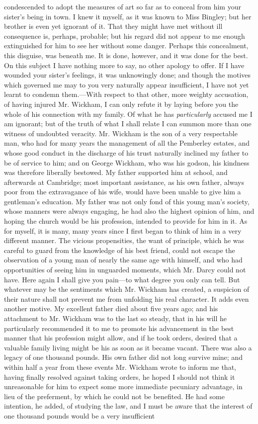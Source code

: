 \documentclass[12pt,openright]{book}
\begin{document}
condescended to adopt the measures of art so far as to conceal from him your sister’s being in town. I knew it myself, as it was known to Miss Bingley; but her brother is even yet ignorant of it. That they might have met without ill consequence is, perhaps, probable; but his regard did not appear to me enough extinguished for him to see her without some danger. Perhaps this concealment, this disguise, was beneath me. It is done, however, and it was done for the best. On this subject I have nothing more to say, no other apology to offer. If I have wounded your sister’s feelings, it was unknowingly done; and though the motives which governed me may to you very naturally appear insufficient, I have not yet learnt to condemn them.—With respect to that other, more weighty accusation, of having injured Mr. Wickham, I can only refute it by laying before you the whole of his connection with my family. Of what he has \textit{particularly} accused me I am ignorant; but of the truth of what I shall relate I can summon more than one witness of undoubted veracity. Mr. Wickham is the son of a very respectable man, who had for many years the management of all the Pemberley estates, and whose good conduct in the discharge of his trust naturally inclined my father to be of service to him; and on George Wickham, who was his godson, his kindness was therefore liberally bestowed. My father supported him at school, and afterwards at Cambridge; most important assistance, as his own father, always poor from the extravagance of his wife, would have been unable to give him a gentleman’s education. My father was not only fond of this young man’s society, whose manners were always engaging, he had also the highest opinion of him, and hoping the church would be his profession, intended to provide for him in it. As for myself, it is many, many years since I first began to think of him in a very different manner. The vicious propensities, the want of principle, which he was careful to guard from the knowledge of his best friend, could not escape the observation of a young man of nearly the same age with himself, and who had opportunities of seeing him in unguarded moments, which Mr. Darcy could not have. Here again I shall give you pain—to what degree you only can tell. But whatever may be the sentiments which Mr. Wickham has created, a suspicion of their nature shall not prevent me from unfolding his real character. It adds even another motive. My excellent father died about five years ago; and his attachment to Mr. Wickham was to the last so steady, that in his will he particularly recommended it to me to promote his advancement in the best manner that his profession might allow, and if he took orders, desired that a valuable family living might be his as soon as it became vacant. There was also a legacy of one thousand pounds. His own father did not long survive mine; and within half a year from these events Mr. Wickham wrote to inform me that, having finally resolved against taking orders, he hoped I should not think it unreasonable for him to expect some more immediate pecuniary advantage, in lieu of the preferment, by which he could not be benefited. He had some intention, he added, of studying the law, and I must be aware that the interest of one thousand pounds would be a very insufficient 
\end{document}
